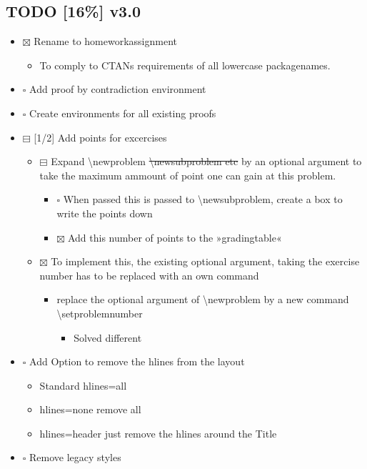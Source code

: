 \documentclass[11pt]{article}
\begin{document}
\subsection{{\bfseries\sffamily TODO} [16\%] v3.0}
\label{sec-3-1}
\begin{itemize}
\item $\boxtimes$ Rename to homeworkassignment
\begin{itemize}
\item To comply to CTANs requirements of all lowercase packagenames.
\end{itemize}
\item $\square$ Add proof by contradiction environment
\item $\square$ Create environments for all existing proofs
\item $\boxminus$ [1/2] Add points for excercises
\begin{itemize}
\item $\boxminus$ Expand \textbackslash{}newproblem 
\sout{\textbackslash{}newsubproblem etc}
by an optional argument to take the maximum ammount of point one
can gain at this problem. 
\begin{itemize}
\item $\square$ When passed this is passed to \textbackslash{}newsubproblem,
create a box to write the points down
\item $\boxtimes$ Add this number of points to the »gradingtable«
\end{itemize}
\item $\boxtimes$ To implement this, the existing optional argument, taking
the exercise number has to be replaced with an own command
\begin{itemize}
\item replace the optional argument of
\textbackslash{}newproblem by a new command
\textbackslash{}setproblemnumber
\begin{itemize}
\item Solved different
\end{itemize}
\end{itemize}
\end{itemize}
\item $\square$ Add Option to remove the hlines from the layout
\begin{itemize}
\item Standard hlines=all
\item hlines=none remove all
\item hlines=header just remove the hlines around the Title
\end{itemize}
\item $\square$ Remove legacy styles
\end{itemize}
\end{document}
